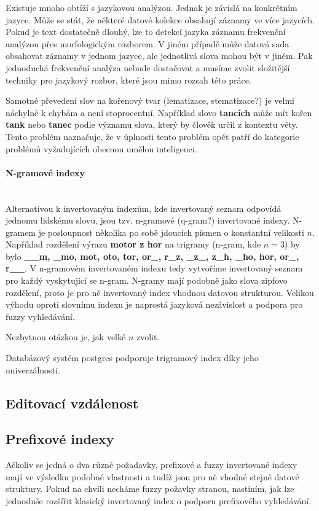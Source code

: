 \documentclass[11pt]{article}
\begin{document}
Existuje mnoho obtíží s jazykovou analýzou. Jednak je závislá na konkrétním
jazyce. Může se stát, že některé datové kolekce obsahují záznamy ve více
jazycích. Pokud je text dostatečně dlouhý, lze to detekcí jazyka záznamu
frekvenční analýzou přes morfologickým rozborem. V jiném případě může datová
sada obsahovat záznamy v jednom jazyce, ale jednotlivá slova mohou být v jiném.
Pak jednoduchá frekvenční analýza nebude dostačovat a musíme zvolit složitější
techniky pro jazykový rozbor, které jsou mimo rozsah této práce.

Samotné převedení slov na kořenový tvar (lematizace, stematizace?) je velmi
náchylné k chybám a není stoprocentní. Například slovo \textbf{tancích} může
mít kořen \textbf{tank} nebo \textbf{tanec} podle významu slova, který by
člověk určil z kontextu věty. Tento problém naznačuje, že v úplnosti tento
problém opět patří do kategorie problémů vyžadujících obecnou umělou
inteligenci.

\paragraph{N-gramové indexy}\mbox{}\\
Alternativou k invertovaným indexům, kde invertovaný seznam odpovídá jednomu
lidskému slovu, jsou tzv. n-gramové (q-gram?) invertované indexy. N-gramem je
posloupnost několika po sobě jdoucích písmen o konstantní velikosti $n$.
Například rozdělení výrazu \textbf{motor z hor} na trigramy (n-gram, kde $n =
3$) by bylo \textbf{\_\_m, \_mo, mot, oto, tor, or\_, r\_z, \_z\_, z\_h, \_ho,
hor, or\_, r\_\_}. V n-gramovém invertovaném indexu tedy vytvoříme invertovaný
seznam pro každý vyskytující se n-gram. N-gramy mají podobně jako slova zipfovo
rozdělení, proto je pro ně invertovaný index vhodnou datovou strukturou.
Velikou výhodu oproti slovnímu indexu je naprostá jazyková nezávislost a
podpora pro fuzzy vyhledávání.

Nezbytnou otázkou je, jak velké $n$ zvolit. %

Databázový systém postgres podporuje trigramový index díky jeho univerzálnosti.

\subsection{Editovací vzdálenost}

\subsection{Prefixové indexy}
Ačkoliv se jedná o dva různé požadavky, prefixové a fuzzy invertované indexy
mají ve výsledku podobné vlastnosti a tudíž jsou pro ně vhodné stejné datové
struktury. Pokud na chvíli necháme fuzzy požavky stranou, nastíním, jak lze
jednoduše rozšířit klasický invertovaný index o podporu prefixového
vyhledávání.
\end{document}

